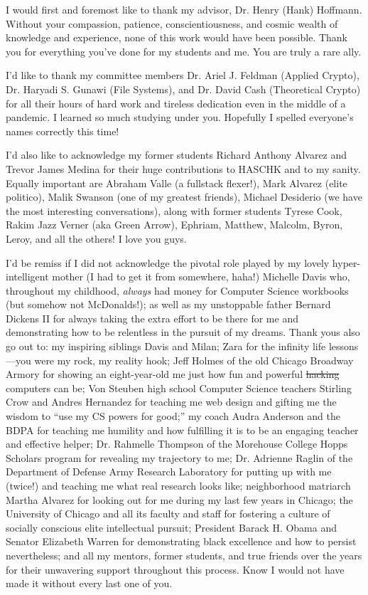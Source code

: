 \acknowledgments
I would first and foremost like to thank my advisor, Dr. Henry (Hank) Hoffmann.
Without your compassion, patience, conscientiousness, and cosmic wealth of
knowledge and experience, none of this work would have been possible. Thank you
for everything you've done for my students and me. You are truly a rare ally.

I'd like to thank my committee members Dr. Ariel J. Feldman (Applied Crypto),
Dr. Haryadi S. Gunawi (File Systems), and Dr. David Cash (Theoretical Crypto)
for all their hours of hard work and tireless dedication even in the middle of a
pandemic. I learned so much studying under you. Hopefully I spelled everyone's
names correctly this time!

I'd also like to acknowledge my former students Richard Anthony Alvarez and
Trevor James Medina for their huge contributions to HASCHK and to my sanity.
Equally important are Abraham Valle (a fullstack flexer!), Mark Alvarez (elite
politico), Malik Swanson (one of my greatest friends), Michael Desiderio (we
have the most interesting conversations), along with former students Tyrese
Cook, Rakim Jazz Verner (aka Green Arrow), Ephriam, Matthew, Malcolm, Byron,
Leroy, and all the others! I love you guys.

I'd be remiss if I did not acknowledge the pivotal role played by my lovely
hyper-intelligent mother (I had to get it from somewhere, haha!) Michelle Davis
who, throughout my childhood, \emph{always} had money for Computer Science
workbooks (but somehow not McDonalds!); as well as my unstoppable father Bernard
Dickens II for always taking the extra effort to be there for me and
demonstrating how to be relentless in the pursuit of my dreams. Thank yous also
go out to: my inspiring siblings Davis and Milan; Zara for the infinity life
lessons---you were my rock, my reality hook; Jeff Holmes of the old Chicago
Broadway Armory for showing an eight-year-old me just how fun and powerful
\sout{hacking} computers can be; Von Steuben high school Computer Science
teachers Stirling Crow and Andres Hernandez for teaching me web design and
gifting me the wisdom to ``use my CS powers for good;'' my coach Audra Anderson
and the BDPA for teaching me humility and how fulfilling it is to be an engaging
teacher and effective helper; Dr. Rahmelle Thompson of the Morehouse College
Hopps Scholars program for revealing my trajectory to me; Dr. Adrienne Raglin of
the Department of Defense Army Research Laboratory for putting up with me
(twice!) and teaching me what real research looks like; neighborhood matriarch
Martha Alvarez for looking out for me during my last few years in Chicago; the
University of Chicago and all its faculty and staff for fostering a culture of
socially conscious elite intellectual pursuit; President Barack H. Obama and
Senator Elizabeth Warren for demonstrating black excellence and how to persist
nevertheless; and all my mentors, former students, and true friends over the
years for their unwavering support throughout this process. Know I would not
have made it without every last one of you.

